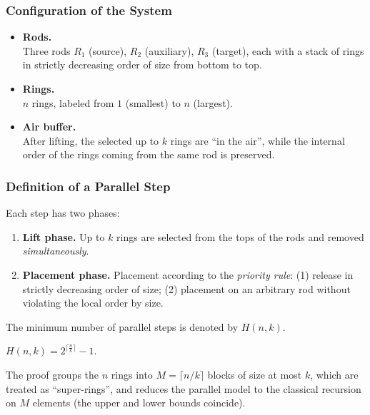 	\subsubsection{Configuration of the System}
	\begin{itemize}
		\item \textbf{Rods.}\\
		Three rods \(R_1\) (source), \(R_2\) (auxiliary), \(R_3\) (target), each with a stack of rings in strictly decreasing order of size from bottom to top.
		\item \textbf{Rings.}\\
		\(n\) rings, labeled from \(1\) (smallest) to \(n\) (largest).
		\item \textbf{Air buffer.}\\
		After lifting, the selected up to \(k\) rings are ``in the air'', while the internal order of the rings coming from the same rod is preserved.
	\end{itemize}
	
	\subsubsection{Definition of a Parallel Step}\label{subsec:parallel-step}
	\hspace*{2.5em}Each step has two phases:
	\vspace{-0.1cm}
	\begin{enumerate}
		\item \textbf{Lift phase.} Up to \(k\) rings are selected from the tops of the rods and removed \emph{simultaneously}.
		\item \textbf{Placement phase.} Placement according to the \emph{priority rule}: (1) release in strictly decreasing order of size; (2) placement on an arbitrary rod without violating the local order by size.
	\end{enumerate}
	\hspace*{2.5em}The minimum number of parallel steps is denoted by \(H(n,k)\).
	
	\begin{Theorem}\label{thm:main}
		$H(n,k) = 2^{\bigl\lceil \textstyle \frac{n}{k} \bigr\rceil} - 1$.
	\end{Theorem}
	
	The proof groups the \(n\) rings into \(M=\lceil n/k\rceil\) blocks of size at most \(k\), which are treated as ``super-rings'', and reduces the parallel model to the classical recursion on \(M\) elements (the upper and lower bounds coincide).
	
